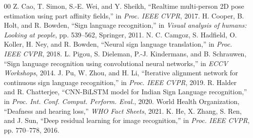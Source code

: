 \documentclass[conference]{IEEEtran}
\begin{document}
\begin{thebibliography}{00}
 Z. Cao, T. Simon, S.-E. Wei, and Y. Sheikh, ``Realtime multi-person 2D pose estimation using part affinity fields,'' in \textit{Proc. IEEE CVPR}, 2017.
 H. Cooper, B. Holt, and R. Bowden, ``Sign language recognition,'' in \textit{Visual analysis of humans: Looking at people}, pp. 539--562, Springer, 2011.
 N. C. Camgoz, S. Hadfield, O. Koller, H. Ney, and R. Bowden, ``Neural sign language translation,'' in \textit{Proc. IEEE CVPR}, 2018.
 L. Pigou, S. Dieleman, P.-J. Kindermans, and B. Schrauwen, ``Sign language recognition using convolutional neural networks,'' in \textit{ECCV Workshops}, 2014.
 J. Pu, W. Zhou, and H. Li, ``Iterative alignment network for continuous sign language recognition,'' in \textit{Proc. IEEE CVPR}, 2019.
 R. Halder and R. Chatterjee, ``CNN-BiLSTM model for Indian Sign Language recognition,'' in \textit{Proc. Int. Conf. Comput. Perform. Eval.}, 2020.
 World Health Organization, ``Deafness and hearing loss,'' \textit{WHO Fact Sheets}, 2021.
 K. He, X. Zhang, S. Ren, and J. Sun, ``Deep residual learning for image recognition,'' in \textit{Proc. IEEE CVPR}, pp. 770--778, 2016.
\end{thebibliography}
\end{document}
